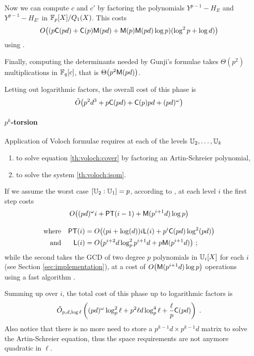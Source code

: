 Now we can compute $c$ and $c'$ by factoring the polynomials
$Y^{p-1}-H_E$ and $Y^{p-1}-H_{E'}$ in $\mathbb{F}_p[X]/Q_1(X)$. This costs
\[O\bigl((p\mathrm{\sf C}(pd) + \mathrm{\sf C}(p)\mathrm{\sf M}(pd) + \mathrm{\sf M}(p)\mathrm{\sf M}(pd)\log
p)(\log^2 p+\log d)\bigr)\]
using \cite[Section 3]{KS97}.

Finally, computing the determinants needed by Gunji's formulae takes
$\Theta(p^2)$ multiplications in $\mathbb{F}_q[c]$, that is
$\Theta\bigl(p^2\mathrm{\sf M}(pd)\bigr)$.

Letting out logarithmic factors, the overall cost of this phase is
\begin{equation}
  \label{eq:gunji-complexity}
  \tilde{O}\bigl(p^2d^3 + p\mathrm{\sf C}(pd) + \mathrm{\sf C}(p)pd + (pd)^\omega \bigr)
\end{equation}


\paragraph{$p^k$-torsion}
Application of Voloch formulae requires at each of the levels
$\mathbb{U}_2,\ldots,\mathbb{U}_k$
\begin{enumerate}
\item to solve equation \eqref{th:voloch:cover} by factoring an
  Artin-Schreier polynomial,
\item to solve the system \eqref{th:voloch:isom}.
\end{enumerate}
If we assume the worst case $[\mathbb{U}_2:\mathbb{U}_1] = p$, according to
\cite[Th. 13]{DFS09}, at each level $i$ the first step costs
\begin{gather*}
  O\bigl((pd)^\omega i + {\sf PT}(i-1) + \mathrm{\sf M}(p^{i+1}d)\log p\bigr)\\[0.3cm]
  \begin{aligned}
    \text{where}&&
    {\sf PT}(i) &= O\bigl((pi + \log(d))i{\sf L}(i) + p^i\mathrm{\sf C}(pd)\log^2(pd)\bigr)\\
    \text{and}&&
    {\sf L}(i) &= O\bigl(p^{i+2}d\log_p^2{p^{i+1}d} + p\mathrm{\sf M}(p^{i+1}d)\bigr)
    \text{ ;}
  \end{aligned}
\end{gather*}
while the second takes the GCD of two degree $p$ polynomials in
$\mathbb{U}_i[X]$ for each $i$ (see Section \ref{sec:implementation}), at a
cost of $O\bigl(\mathrm{\sf M}(p^{i+1}d)\log p\bigr)$ operations using a fast
algorithm \cite[$\S$11.1]{vzGG}.

Summing up over $i$, the total cost of this phase up to logarithmic
factors is
\begin{equation}
  \label{eq:C2-AS:complexity:p^k}
  \tilde{O}_{p,d,\log\ell}\left((pd)^\omega \log_p^2\ell + p^2\ell d\log_p^4\ell +
  \frac{\ell}{p}\mathrm{\sf C}(pd)\right)
  \;\text{.}  
\end{equation}
Also notice that there is no more need to store a $p^{k-1}d\times
p^{k-1}d$ matrix to solve the Artin-Schreier equation, thus the space
requirements are not anymore quadratic in $\ell$.


